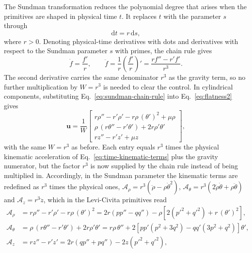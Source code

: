 The Sundman transformation reduces the polynomial degree that arises when the
primitives are shaped in physical time $t$. It replaces $t$ with the parameter
$s$ through
\begin{equation}
	\mathrm{d}t=r\,\mathrm{d}s,
	\label{eq:sundman-transformation}
\end{equation}
where $r>0$. Denoting physical-time derivatives with dots and derivatives
with respect to the Sundman parameter $s$ with primes, the chain rule gives
\begin{equation}
	\dot f=\frac{f'}{r},
	\qquad
	\ddot f
	=\frac{1}{r}\left(\frac{f'}{r}\right)'
	=\frac{rf''-r'f'}{r^3}.
	\label{eq:sundman-chain-rule}
\end{equation}
The second derivative carries the same denominator $r^3$ as the gravity
term, so no further multiplication by $W=r^3$ is needed to clear the control.
In cylindrical components, substituting Eq.~\eqref{eq:sundman-chain-rule}
into Eq.~\eqref{eq:flatness2} gives
\begin{equation}
\mathbf{u}=\dfrac{1}{W}\begin{bmatrix}
r\rho''-r'\rho'-r\rho\,(\theta')^2+\mu\rho\\
\rho\,(r\theta''-r'\theta')+2r\rho'\theta'\\
rz''-r'z'+\mu z
\end{bmatrix},
\label{eq:sundman-control}
\end{equation}
with the same $W=r^3$ as before. Each entry equals $r^3$ times the physical
kinematic acceleration of Eq.~\eqref{eq:time-kinematic-terms} plus the
gravity numerator, but the factor $r^3$ is now supplied by the chain rule
instead of being multiplied in. Accordingly, in the Sundman parameter the
kinematic terms are redefined as $r^3$ times the physical ones,
$\mathcal A_\rho=r^3(\ddot\rho-\rho\dot\theta^2)$,
$\mathcal A_\theta=r^3(2\dot\rho\dot\theta+\rho\ddot\theta)$ and
$\mathcal A_z=r^3\ddot z$, which in the Levi-Civita primitives read
\begin{equation}
	\begin{aligned}
		\mathcal A_\rho
		&=r\rho''-r'\rho'-r\rho\,(\theta')^2
		=2r\left(pp''-qq''\right)
		-\rho\left[2\left(p'^2+q'^2\right)+r\,(\theta')^2\right],\\
		\mathcal A_\theta
		&=\rho\,(r\theta''-r'\theta')+2r\rho'\theta'
		= r\rho\,\theta''
		+2\left[pp'\left(p^2+3q^2\right)-qq'\left(3p^2+q^2\right)\right]\theta',\\
		\mathcal A_z
		&=rz''-r'z'
		= 2r\left(qp''+pq''\right)-2z\left(p'^2+q'^2\right),
	\end{aligned}
	\label{eq:sundman-kinematic-pq}
\end{equation}
